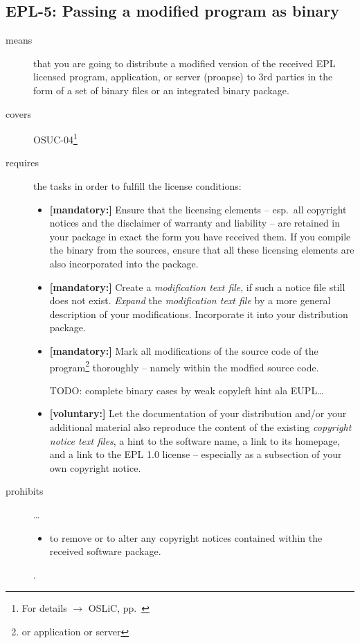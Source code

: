 \subsection{EPL-5: Passing a modified program as binary}

\begin{description}
\item[means] that you are going to distribute a modified version of the received
EPL licensed pro\-gram, application, or server (proapse) to 3rd parties in
the form of a set of binary files or an integrated binary package.
\item[covers] OSUC-04\footnote{For details $\rightarrow$ OSLiC, pp.\ \pageref{OSUC-04-DEF}}
\item[requires] the tasks in order to fulfill the license conditions:
\begin{itemize}

  \item \textbf{[mandatory:]} Ensure that the licensing elements -- esp.\ all
  copyright notices and the disclaimer of warranty and liability -- are retained
  in your package in exact the form you have received them. If you compile the
  binary from the sources, ensure that all these licensing elements are also
  incorporated into the package.

  \item \textbf{[mandatory:]} Create a \emph{modification text file}, if such a
  notice file still does not exist. \emph{Expand} the \emph{modification text
  file} by a more general description of your modifications. Incorporate it into
  your distribution package.

  \item \textbf{[mandatory:]} Mark all modifications of the source code of the
  program\footnote{or application or server} thoroughly -- namely within the
  modfied source code.
  
  TODO: complete binary cases by weak copyleft hint ala EUPL\ldots  

 
  \item \textbf{[voluntary:]} Let the documentation of your distribution and/or
  your additional material  also reproduce the content of the existing
  \emph{copyright notice text files}, a hint to the software name, a link to its
  homepage, and a link to the EPL 1.0 license -- especially as a subsection of
  your own copyright notice.


\end{itemize}  

\item[prohibits] \ldots
\begin{itemize}
  \item to remove or to alter any copyright notices contained within the
  received software package.
\end{itemize}.

\end{description}

